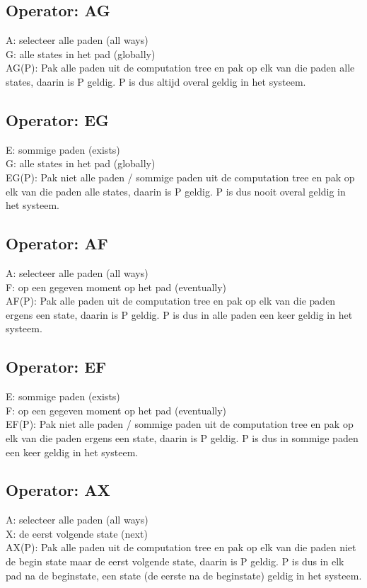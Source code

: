\documentclass{article}
\begin{document}
\subsection{Operator: AG}
A: selecteer alle paden (all ways)\\
G: alle states in het pad (globally)\\
AG(P): Pak alle paden uit de computation tree en pak op elk van die paden alle states, daarin is P geldig. P is dus altijd overal geldig in het systeem.

\subsection{Operator: EG}
E: sommige paden (exists)\\
G: alle states in het pad (globally)\\
EG(P): Pak niet alle paden / sommige paden uit de computation tree en pak op elk van die paden alle states, daarin is P geldig. P is dus nooit overal geldig in het systeem.

\subsection{Operator: AF}
A: selecteer alle paden (all ways)\\
F: op een gegeven moment op het pad (eventually)\\
AF(P): Pak alle paden uit de computation tree en pak op elk van die paden ergens een state, daarin is P geldig. P is dus in alle paden een keer geldig in het systeem.

\subsection{Operator: EF}
E: sommige paden (exists)\\
F: op een gegeven moment op het pad (eventually)\\
EF(P): Pak niet alle paden / sommige paden uit de computation tree en pak op elk van die paden ergens een state, daarin is P geldig. P is dus in sommige paden een keer geldig in het systeem.

\subsection{Operator: AX}
A: selecteer alle paden (all ways)\\
X: de eerst volgende state (next)\\
AX(P): Pak alle paden uit de computation tree en pak op elk van die paden niet de begin state maar de eerst volgende state, daarin is P geldig. P is dus in elk pad na de beginstate, een state (de eerste na de beginstate) geldig in het systeem.
\end{document}
